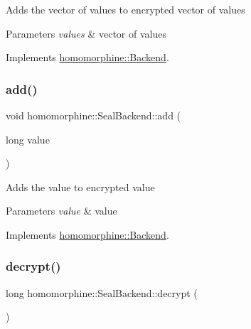 Adds the vector of values to encrypted vector of values


\begin{DoxyParams}{Parameters}
{\em values} & vector of values \\
\hline
\end{DoxyParams}


Implements \mbox{\hyperlink{classhomomorphine_1_1_backend_ae381fb973ade6dd6a5caf8f6785e165e}{homomorphine\+::\+Backend}}.

\mbox{\label{classhomomorphine_1_1_seal_backend_acbff51d94165f4e578cafaeb965e4367}} 
\subsubsection{\texorpdfstring{add()}{add()}\hspace{0.1cm}{\footnotesize\ttfamily [2/2]}}
{\footnotesize\ttfamily void homomorphine\+::\+Seal\+Backend\+::add (\begin{DoxyParamCaption}\item[{long}]{value }\end{DoxyParamCaption})\hspace{0.3cm}{\ttfamily [virtual]}}

Adds the value to encrypted value


\begin{DoxyParams}{Parameters}
{\em value} & value \\
\hline
\end{DoxyParams}


Implements \mbox{\hyperlink{classhomomorphine_1_1_backend_a7175812578b22d9ff19d49760cb04b26}{homomorphine\+::\+Backend}}.

\mbox{\label{classhomomorphine_1_1_seal_backend_a0496053defd79b8bd42d4d9c6b4b4ccc}} 
\subsubsection{\texorpdfstring{decrypt()}{decrypt()}}
{\footnotesize\ttfamily long homomorphine\+::\+Seal\+Backend\+::decrypt (\begin{DoxyParamCaption}{ }\end{DoxyParamCaption})\hspace{0.3cm}{\ttfamily [virtual]}}


